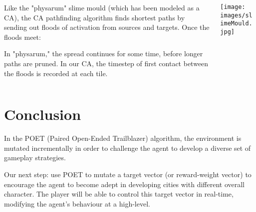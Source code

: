 \documentclass[xcolor=dvipsnames]{beamer}
\begin{document}
\begin{frame}
\begin{columns}
    \begin{column}{0.7\linewidth}
Like the "physarum" slime mould (which has been modeled as a CA), the CA pathfinding algorithm finds shortest paths by sending out floods of activation from sources and targets. Once the floods meet:
\begin{outline}
    \1 In "physarum," the spread continues for some time, before longer paths are pruned.
    \1 In our CA, the timestep of first contact between the floods is recorded at each tile.
\end{outline}
    \end{column}
    \begin{column}{0.3\linewidth}
\texttt{[image: images/slimeMould.jpg]}
    \end{column}
\end{columns}
\end{frame}


%
%
%

\section{Conclusion}

\begin{frame}
    In the POET (Paired Open-Ended Trailblazer) algorithm, the environment is mutated incrementally in order to challenge the agent to develop a diverse set of gameplay strategies.

    \begin{outline}
    \1 Our next step: use POET to mutate a target vector (or reward-weight vector) to encourage the agent to become adept in developing cities with different overall character.
        \2 The player will be able to control this target vector in real-time, modifying the agent's behaviour at a high-level.
    \end{outline}
\end{frame}
\end{document}

